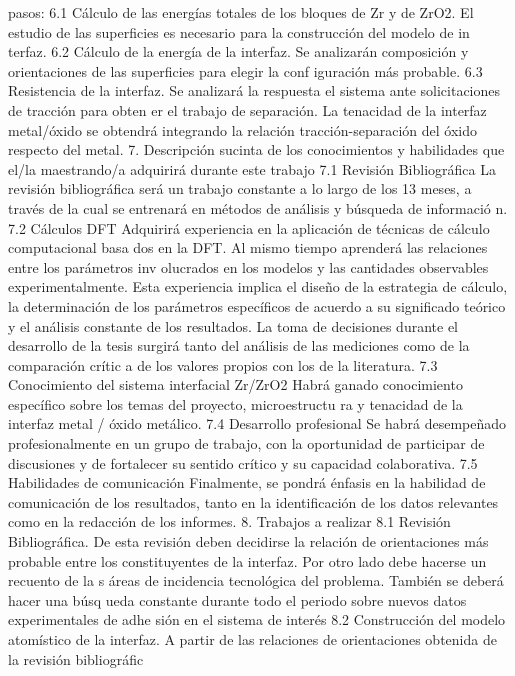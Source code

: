 pasos:
6.1  Cálculo de las energías totales de los bloques de Zr y de ZrO2.
El estudio de las superficies es necesario para la construcción del modelo de in
terfaz.
6.2  Cálculo de la energía de la interfaz.
Se analizarán composición y orientaciones de las superficies para elegir la conf
iguración más probable.
6.3  Resistencia de la interfaz.
 Se analizará la respuesta el sistema ante solicitaciones de tracción para obten
er el trabajo de separación. La tenacidad de la interfaz metal/óxido se obtendrá
 integrando la relación tracción-separación del óxido respecto del metal.
7. Descripción sucinta de los conocimientos y habilidades que el/la maestrando/a
 adquirirá durante este trabajo
7.1  Revisión Bibliográfica
La revisión bibliográfica será un trabajo constante a lo largo de los 13 meses, 
a través de la cual se entrenará en métodos de análisis y búsqueda de informació
n.
7.2  Cálculos DFT
Adquirirá experiencia en la aplicación de técnicas de cálculo computacional basa
dos en la DFT. Al mismo tiempo aprenderá las relaciones entre los parámetros inv
olucrados en los modelos y las cantidades observables experimentalmente.
Esta experiencia implica el diseño de la estrategia de cálculo, la determinación
 de los parámetros específicos de acuerdo a su significado teórico y el análisis
 constante de los resultados. La toma de decisiones durante el desarrollo de la 
tesis surgirá tanto del análisis de las mediciones como de la comparación crític
a de los valores propios con los de la literatura.
7.3  Conocimiento del sistema interfacial Zr/ZrO2
Habrá ganado conocimiento específico sobre los temas del proyecto, microestructu
ra y tenacidad de la interfaz metal / óxido metálico. 
7.4  Desarrollo profesional
Se habrá desempeñado profesionalmente en un grupo de trabajo, con la oportunidad
 de participar de discusiones y de fortalecer su sentido crítico y su capacidad 
colaborativa.
7.5  Habilidades de comunicación
Finalmente, se pondrá énfasis en la habilidad de comunicación de los resultados,
 tanto en la identificación de los datos relevantes como en la redacción de los 
informes. 
8. Trabajos a realizar
8.1  Revisión Bibliográfica. 
De esta revisión deben decidirse la relación de orientaciones más probable entre
 los constituyentes de la interfaz. Por otro lado debe hacerse un recuento de la
s áreas de incidencia tecnológica del problema. También se deberá hacer una búsq
ueda constante durante todo el periodo sobre nuevos datos experimentales de adhe
sión en el sistema de interés
8.2  Construcción del modelo atomístico de la interfaz.
A partir de las relaciones de orientaciones obtenida de la revisión bibliográfic
